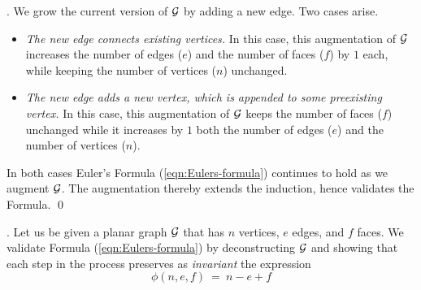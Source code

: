 .
We grow the current version of $\mbox{$\cal G$}$ by adding a new edge.  Two cases arise.
\begin{itemize}
\item
{\em The new edge connects existing vertices.}
In this case, this augmentation of $\mbox{$\cal G$}$ increases the number of edges ($e$) and the
number of faces ($f$) by $1$ each, while keeping the number of vertices
($n$) unchanged.

\item
{\em The new edge adds a new vertex, which is appended to some preexisting vertex.}
In this case, this augmentation of $\mbox{$\cal G$}$ keeps the number of faces ($f$) unchanged while
it increases by $1$ both the number of edges ($e$) and the number of vertices ($n$). 
\end{itemize}
In both cases Euler's Formula (\ref{eqn:Eulers-formula}) continues to hold as we augment
$\mbox{$\cal G$}$.  The augmentation thereby extends the induction, hence validates the Formula.
\qed

\bigskip


.
Let us be given a planar graph $\mbox{$\cal G$}$ that has $n$ vertices, $e$ edges, and $f$
faces.  We validate Formula (\ref{eqn:Eulers-formula}) by deconstructing $\mbox{$\cal G$}$ and showing
that each step in the process preserves as {\it invariant} the expression
\begin{equation}
\label{eq:phi-in-euler-formula}
 \phi(n,e,f) \ = \ n-e+f
\end{equation}

\bigskip

\noindent {}
\bigskip

